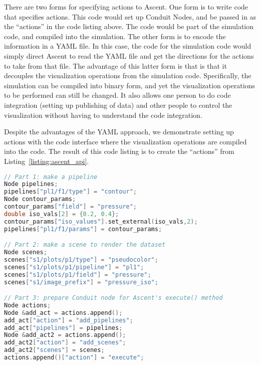 There are two forms for specifying actions to Ascent.
%
One form is to write code that specifies actions.
%
This code would set up Conduit Nodes, and be passed in as the ``actions'' in the
code listing above.
%
The code would be part of the simulation code, and compiled into the simulation.
%
The other form is to encode the information in a YAML file.
%
In this case, the code for the simulation code would simply direct Ascent to read
the YAML file and get the directions for the actions to take from that file.
%
The advantage of this latter form is that is that it decouples the visualization
operations from the simulation code.
%
Specifically, the simulation can be compiled into binary form, and yet the visualization
operations to be performed can still be changed.
%
It also allows one person to do code integration (setting up publishing of data)
and other people to control the visualization without having to understand
the code integration.

Despite the advantages of the YAML approach, we demonstrate setting up actions with
the code interface where the visualization operations are compiled into the code.
%
The result of this code listing is to create the ``actions'' from Listing~\ref{listing:ascent_api}.

\begin{lstlisting}[language=C++,caption={\label{listing:actions}Setting up Ascent actions using the C++ bindings.
%
This listing is broken into three parts.  
%
The first part makes a pipeline named ``pl1'' with one filter named ``f1.''
%
The second part makes a scene named ``s1'' which is connected to pipeline ``pl1.''
%
The third part tells Ascent to add the pipeline, add the scene, and then execute both.
}]
// Part 1: make a pipeline
Node pipelines;
pipelines["pl1/f1/type"] = "contour";
Node contour_params;
contour_params["field"] = "pressure";
double iso_vals[2] = {0.2, 0.4};
contour_params["iso_values"].set_external(iso_vals,2);
pipelines["pl1/f1/params"] = contour_params;

// Part 2: make a scene to render the dataset
Node scenes;
scenes["s1/plots/p1/type"] = "pseudocolor";
scenes["s1/plots/p1/pipeline"] = "pl1";
scenes["s1/plots/p1/field"] = "pressure";
scenes["s1/image_prefix"] = "pressure_iso";

// Part 3: prepare Conduit node for Ascent's execute() method
Node actions;
Node &add_act = actions.append();
add_act["action"] = "add_pipelines";
add_act["pipelines"] = pipelines;
Node &add_act2 = actions.append();
add_act2["action"] = "add_scenes";
add_act2["scenes"] = scenes;
actions.append()["action"] = "execute";
\end{lstlisting}

